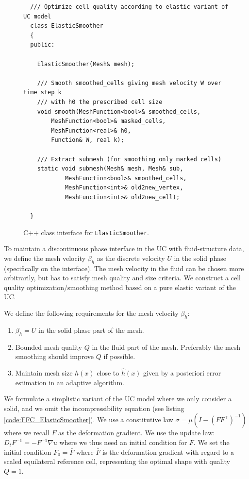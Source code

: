 \begin{figure}[!h]
\begin{lstlisting}
  /// Optimize cell quality according to elastic variant of UC model
  class ElasticSmoother
  {
  public:

    ElasticSmoother(Mesh& mesh);

    /// Smooth smoothed_cells giving mesh velocity W over time step k
    /// with h0 the prescribed cell size
    void smooth(MeshFunction<bool>& smoothed_cells,
		MeshFunction<bool>& masked_cells,
		MeshFunction<real>& h0,
		Function& W, real k);

    /// Extract submesh (for smoothing only marked cells)
    static void submesh(Mesh& mesh, Mesh& sub,
			MeshFunction<bool>& smoothed_cells,
			MeshFunction<int>& old2new_vertex,
			MeshFunction<int>& old2new_cell);

  }
\end{lstlisting}
\caption{
C++ class interface for {\tt ElasticSmoother}.
}
\label{code:ElasticSmoother}
\end{figure}

To maintain a discontinuous phase interface in the UC with
fluid-structure data, we define the mesh velocity $\beta_h$ as the
discrete velocity $U$ in the solid phase (specifically on the
interface). The mesh velocity in the fluid can be chosen more
arbitrarily, but has to satisfy mesh quality and size criteria. We
construct a cell quality optimization/smoothing method based on a pure
elastic variant of the UC.

We define the following requirements for the mesh velocity $\beta_h$:

\begin{enumerate}
\item
$\beta_h = U$ in the solid phase part of the mesh.
\item
Bounded mesh quality $Q$ in the fluid part of the mesh. Preferably the
mesh smoothing should improve $Q$ if possible.
\item
Maintain mesh size $h(x)$ close to $\hat{h}(x)$ given by a posteriori
error estimation in an adaptive algorithm.
\end{enumerate}

We formulate a simplistic variant of the UC model where we only
consider a solid, and we omit the incompressibility equation (see
listing \ref{code:FFC_ElasticSmoother}). We use a constitutive law
$\sigma = \mu(I - (FF^\top)^{-1})$ where we recall $F$ as the
deformation gradient. We use the update law: $D_t F^{-1} =
-F^{-1} \nabla u$ where we thus need an initial condition for $F$. We
set the initial condition $F_0 = \bar{F}$ where $\bar{F}$ is the
deformation gradient with regard to a scaled equilateral reference
cell, representing the optimal shape with quality $Q = 1$.


